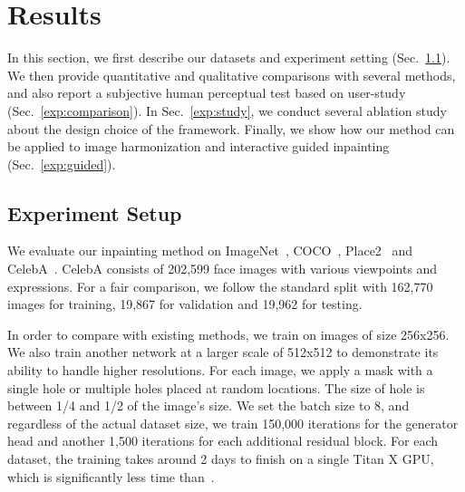 \section{Results}
\label{sec:results}
In this section, we first describe our datasets and experiment setting (Sec.~\ref{exp:setup}). We then provide quantitative and qualitative comparisons with several methods, and also report a subjective human perceptual test based on user-study (Sec.~\ref{exp:comparison}). In Sec.~\ref{exp:study}, we conduct several ablation study about the design choice of the framework. Finally, we show how our method can be applied to image harmonization and interactive guided inpainting (Sec.~\ref{exp:guided}).

\subsection{Experiment Setup}
\label{exp:setup}
We evaluate our inpainting method on ImageNet~\cite{russakovsky2015imagenet}, COCO~\cite{lin2014microsoft}, Place2~\cite{zhou2016places} and CelebA~\cite{liu2015faceattributes}. CelebA consists of 202,599 face images with various viewpoints and expressions. For a fair comparison, we follow the standard split with 162,770 images for training, 19,867 for validation and 19,962 for testing.

In order to compare with existing methods, we train on images of size 256x256. We also train another network at a larger scale of 512x512 to demonstrate its ability to handle higher resolutions. For each image, we apply a mask with a single hole or multiple holes placed at random locations. The size of hole is between 1/4 and 1/2 of the image's size. We set the batch size to 8, and regardless of the actual dataset size, we train 150,000 iterations for the generator head and another 1,500 iterations for each additional residual block. For each dataset, the training takes around 2 days to finish on a single Titan X GPU, which is significantly less time than~\cite{iizuka2017globally}.

